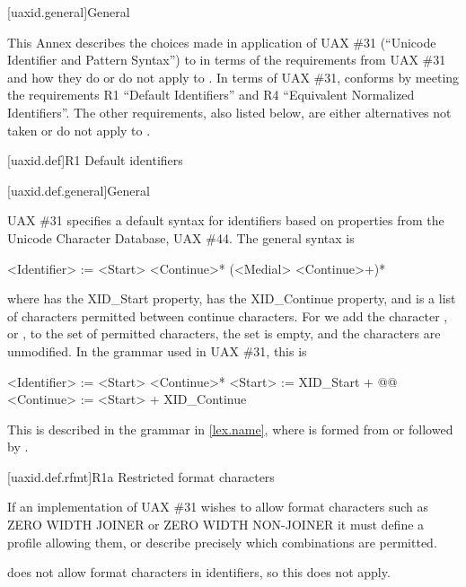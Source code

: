 
[uaxid.general]{General}

\pnum
This Annex describes the choices made in application of
UAX \#31 (``Unicode Identifier and Pattern Syntax'')
to \Cpp{} in terms of the requirements from UAX \#31 and
how they do or do not apply to \Cpp{}.
In terms of UAX \#31,
\Cpp{} conforms by meeting the requirements
R1 ``Default Identifiers'' and
R4 ``Equivalent Normalized Identifiers''.
The other requirements, also listed below,
are either alternatives not taken or do not apply to \Cpp{}.

[uaxid.def]{R1 Default identifiers}

[uaxid.def.general]{General}

\pnum
UAX \#31 specifies a default syntax for identifiers
based on properties from the Unicode Character Database, UAX \#44.
The general syntax is
\begin{codeblock}
<Identifier> := <Start> <Continue>* (<Medial> <Continue>+)*
\end{codeblock}
where  has the XID_Start property,
 has the XID_Continue property, and
 is a list of characters permitted between continue characters.
For \Cpp{} we add the character , or \tcode{_},
to the set of permitted  characters,
the  set is empty, and
the  characters are unmodified.
In the grammar used in UAX \#31, this is
\begin{codeblock}
<Identifier> := <Start> <Continue>*
<Start> := XID_Start + @\textrm{}@
<Continue> := <Start> + XID_Continue
\end{codeblock}

\pnum
This is described in the \Cpp{} grammar in \ref{lex.name},
where  is formed from
 or
 followed by .

[uaxid.def.rfmt]{R1a Restricted format characters}

\pnum
If an implementation of UAX \#31 wishes to allow format characters
such as ZERO WIDTH JOINER or ZERO WIDTH NON-JOINER
it must define a profile allowing them, or
describe precisely which combinations are permitted.

\pnum
\Cpp{} does not allow format characters in identifiers, so this does not apply.

